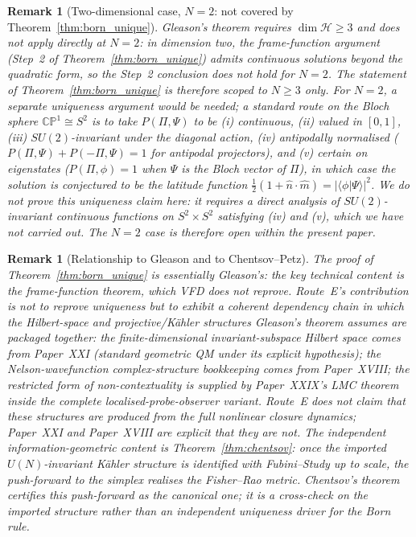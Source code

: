 \documentclass[12pt]{article}
\newtheorem{remark}[theorem]{Remark}
\newcommand{\Hcal}{\mathcal{H}}
\begin{document}
\begin{remark}[Two-dimensional case, $N = 2$: not covered by Theorem~\ref{thm:born_unique}]\label{rem:N_two}
Gleason's theorem requires $\dim \Hcal \geq 3$ and does not apply directly at $N = 2$: in dimension two, the frame-function argument (Step~2 of Theorem~\ref{thm:born_unique}) admits continuous solutions beyond the quadratic form, so the Step~2 conclusion does not hold for $N = 2$. The statement of Theorem~\ref{thm:born_unique} is therefore scoped to $N \geq 3$ only. For $N = 2$, a separate uniqueness argument would be needed; a standard route on the Bloch sphere $\mathbb{CP}^1 \cong S^2$ is to take $P(\Pi, \Psi)$ to be (i) continuous, (ii) valued in $[0,1]$, (iii) $SU(2)$-invariant under the diagonal action, (iv) antipodally normalised ($P(\Pi, \Psi) + P(-\Pi, \Psi) = 1$ for antipodal projectors), and (v) certain on eigenstates ($P(\Pi, \phi) = 1$ when $\Psi$ is the Bloch vector of $\Pi$), in which case the solution is conjectured to be the latitude function $\tfrac12(1 + \hat{n}\cdot\hat{m}) = |\langle\phi|\Psi\rangle|^2$. We do not prove this uniqueness claim here: it requires a direct analysis of $SU(2)$-invariant continuous functions on $S^2 \times S^2$ satisfying (iv) and (v), which we have not carried out. The $N = 2$ case is therefore open within the present paper.
\end{remark}

\begin{remark}[Relationship to Gleason and to Chentsov--Petz]\label{rem:gleason_relation}
The proof of Theorem~\ref{thm:born_unique} is essentially Gleason's: the key technical content is the frame-function theorem, which VFD does not reprove. Route~E's contribution is not to reprove uniqueness but to exhibit a coherent dependency chain in which the Hilbert-space and projective/K\"ahler structures Gleason's theorem assumes are packaged together: the finite-dimensional invariant-subspace Hilbert space comes from Paper~XXI (standard geometric QM under its explicit hypothesis); the Nelson-wavefunction complex-structure bookkeeping comes from Paper~XVIII; the restricted form of non-contextuality is supplied by Paper~XXIX's LMC theorem inside the complete localised-probe-observer variant. Route~E does \emph{not} claim that these structures are produced from the full nonlinear closure dynamics; Paper~XXI and Paper~XVIII are explicit that they are not. The independent information-geometric content is Theorem~\ref{thm:chentsov}: once the imported $U(N)$-invariant K\"ahler structure is identified with Fubini--Study up to scale, the push-forward to the simplex realises the Fisher--Rao metric. Chentsov's theorem certifies this push-forward as the canonical one; it is a cross-check on the imported structure rather than an independent uniqueness driver for the Born rule.
\end{remark}
\end{document}
